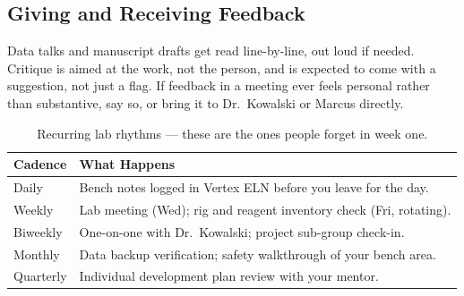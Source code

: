 \subsection*{Giving and Receiving Feedback}
Data talks and manuscript drafts get read line-by-line, out loud if needed. Critique is aimed
at the work, not the person, and is expected to come with a suggestion, not just a flag. If
feedback in a meeting ever feels personal rather than substantive, say so, or bring it to
Dr.\ Kowalski or Marcus directly.

\begin{table}[h]
\centering
\small
\begin{tabular}{@{}p{3.1cm}p{10.4cm}@{}}
\toprule
\rowcolor{labpale}
\textbf{Cadence} & \textbf{What Happens} \\
\midrule
Daily & Bench notes logged in Vertex ELN before you leave for the day. \\
Weekly & Lab meeting (Wed); rig and reagent inventory check (Fri, rotating). \\
Biweekly & One-on-one with Dr.\ Kowalski; project sub-group check-in. \\
Monthly & Data backup verification; safety walkthrough of your bench area. \\
Quarterly & Individual development plan review with your mentor. \\
\bottomrule
\end{tabular}
\caption{Recurring lab rhythms --- these are the ones people forget in week one.}
\end{table}
